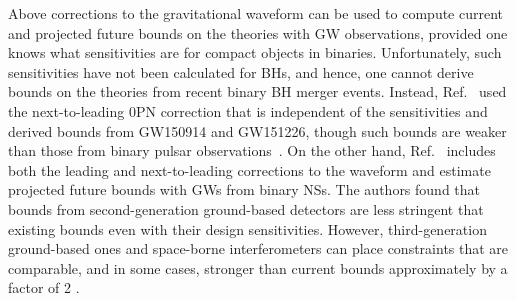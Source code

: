 \documentclass[prd,twocolumn,nofootinbib]{revtex4-1}
\newcommand{\KG}{{\mbox{\tiny kh}}}
\begin{document}
Above corrections to the gravitational waveform can be used to compute current and projected future bounds on the theories with GW observations, provided one knows what sensitivities are for compact objects in binaries. Unfortunately, such sensitivities have not been calculated for BHs, and hence, one cannot derive bounds on the theories from recent binary BH merger events. Instead, Ref.~\cite{Yunes:2016jcc} used the next-to-leading 0PN correction that is independent of the sensitivities and derived bounds from GW150914 and GW151226, though such bounds are weaker than those from binary pulsar observations~\cite{Yagi:2013ava,Yagi:2013qpa}. On the other hand, Ref.~\cite{Hansen:2014ewa} includes both the leading and next-to-leading corrections to the waveform and estimate projected future bounds with GWs from binary NSs. The authors found that bounds from second-generation ground-based detectors are less stringent that existing bounds even with their design sensitivities. However, third-generation ground-based ones and space-borne interferometers can place constraints that are comparable, and in some cases, stronger than current bounds approximately by a factor of 2 \cite{Hansen:2014ewa}.
  
\end{document}
